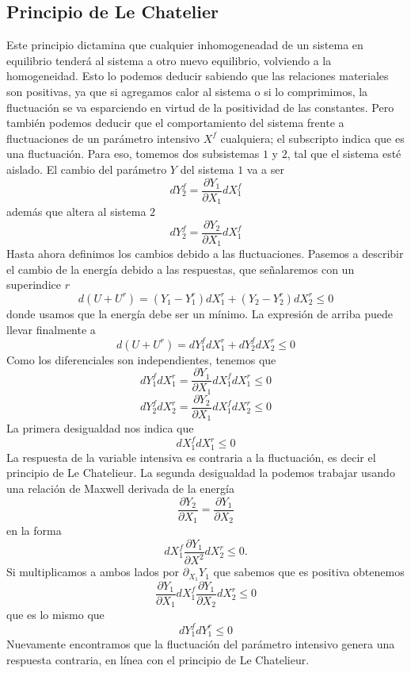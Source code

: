 \subsection{Principio de Le Chatelier}
Este principio dictamina que cualquier inhomogeneadad de un sistema en equilibrio tenderá al sistema a otro nuevo equilibrio, volviendo a la homogeneidad.
Esto lo podemos deducir sabiendo que las relaciones materiales son positivas, ya que si agregamos calor al sistema o si lo comprimimos, la fluctuación se va esparciendo en virtud de la positividad de las constantes.
Pero también podemos deducir que el comportamiento del sistema frente a fluctuaciones de un parámetro intensivo $X^f$ cualquiera; el subscripto indica que es una fluctuación.
Para eso, tomemos dos subsistemas $1$ y $2$, tal que el sistema esté aislado.
El cambio del parámetro $Y$ del sistema $1$ va a ser
\[dY^f_2 = \frac{\partial Y_1}{\partial X_1} dX^f_1\]
además que altera al sistema $2$
\[ dY^f_2 = \frac{\partial Y_2}{\partial X_1} dX^f_1\]
Hasta ahora definimos los cambios debido a las fluctuaciones.
Pasemos a describir el cambio de la energía debido a las respuestas, que señalaremos con un superindice $r$
\[d(U + U^r) = (Y_1 - Y^r_1) dX^r_1 + (Y_2 - Y^r_2) dX^r_2 \leq 0 \]
donde usamos que la energía debe ser un mínimo.
La expresión de arriba puede llevar finalmente a
\[ d(U + U^r) = dY^f_1 dX^r_1 + dY^f_2 dX^r_2 \leq 0\]
Como los diferenciales son independientes, tenemos que
\[dY^f_1 dX^r_1 = \frac{\partial Y_1}{\partial X_1} dX^f_1 dX^r_1 \leq 0\]
\[dY^f_2 dX^r_2 = \frac{\partial Y_2}{\partial X_1} dX^f_1 dX^r_2 \leq 0\]
La primera desigualdad nos indica que
\begin{equation}
dX^f_1 dX^r_1 \leq 0
\end{equation}
La respuesta de la variable intensiva es contraria a la fluctuación, es decir el principio de Le Chatelieur.
La segunda desigualdad la podemos trabajar usando una relación de Maxwell derivada de la energía
\[ \frac{\partial Y_2}{\partial X_1} = \frac{\partial Y_1}{\partial X_2}\]
en la forma
\[dX^f_1 \frac{\partial Y_1}{\partial X^2} dX^r_2 \leq 0.\]
Si multiplicamos a ambos lados por $\partial_{X_1} Y_1$ que sabemos que es positiva obtenemos
\[\frac{\partial Y_1}{\partial X_1} dX^f_1 \frac{\partial Y_1}{\partial X_2} dX^r_2 \leq 0\]
que es lo mismo que
\begin{equation}
dY^f_1 dY^r_1 \leq 0
\end{equation}
Nuevamente encontramos que la fluctuación del parámetro intensivo genera una respuesta contraria, en línea con el principio de Le Chatelieur.
